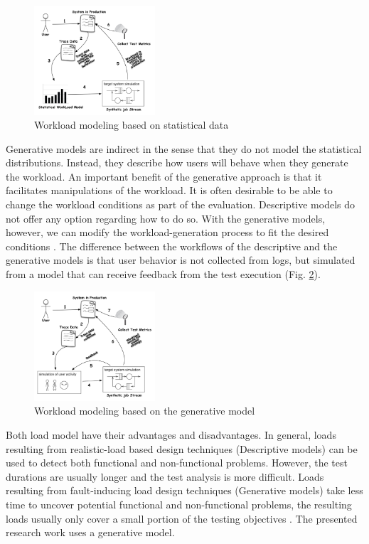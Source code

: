 \documentclass[review]{elsarticle}
\begin{document}
\begin{figure}[!ht]
\centering
\includegraphics[width=0.4\textwidth]{./images/workloadmodel1300dpi.png}
\caption{Workload modeling based on statistical data \cite{DiLucca2006}}
\label{fig:descriptivemodel}
\end{figure}

Generative models are indirect in the sense that they do not model the statistical distributions. Instead, they describe how users will behave when they generate the workload. An important benefit of the generative approach is that it facilitates manipulations of the workload. It is often desirable to be able to change the workload conditions as part of the evaluation. Descriptive models do not offer any option regarding how to do so. With the generative models, however, we can modify the workload-generation process to fit the desired conditions \cite{DiLucca2006}. The difference between the workflows of the descriptive and the generative models is that user behavior is not collected from logs, but simulated from a model that can receive feedback from the test execution (Fig. \ref{fig:generativemodel}).

\begin{figure}[!ht]
\centering
\includegraphics[width=0.4\textwidth]{./images/workloadmodel2300dpi.png}
\caption{Workload modeling based on the generative model \cite{DiLucca2006}}
\label{fig:generativemodel}
\end{figure}

Both load model have their advantages and disadvantages. In general, loads resulting from realistic-load based design techniques (Descriptive models) can be used to detect both functional and non-functional problems. However, the test durations are usually longer and the test analysis is more difficult. Loads resulting from fault-inducing load design techniques (Generative models) take less time to uncover potential functional and non-functional problems, the resulting loads usually only cover a small portion of the testing objectives \cite{Jiang2010}. The presented research work uses a generative model.
\end{document}
